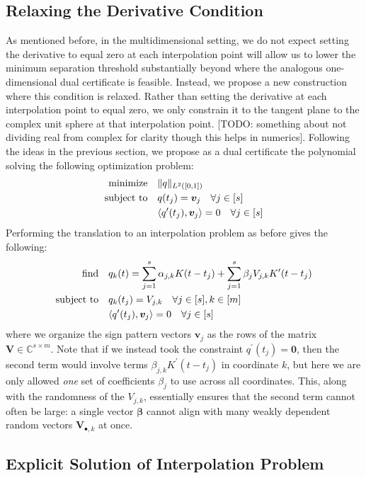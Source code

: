 \documentclass[11pt]{article}
\newcommand{\ra}{\rangle}
\newcommand{\la}{\langle}
\newcommand{\CC}{\mathbb{C}}
\newcommand{\HS}{\hspace{3.5mm}}
\newcommand{\bV}{\bm V}
\newcommand{\bv}{\bm v}
\begin{document}
\subsection{Relaxing the Derivative Condition}

As mentioned before, in the multidimensional setting, we do not expect setting the derivative to equal zero at each interpolation point will allow us to lower the minimum separation threshold substantially beyond where the analogous one-dimensional dual certificate is feasible.
Instead, we propose a new construction where this condition is relaxed.
Rather than setting the derivative at each interpolation point to equal zero, we only constrain it to the tangent plane to the complex unit sphere at that interpolation point.
[TODO: something about not dividing real from complex for clarity though this helps in numerics].
Following the ideas in the previous section, we propose as a dual certificate the polynomial solving the following optimization problem:
\begin{align}
  \text{minimize} &\HS \|q\|_{L^2([0, 1])} \\
  \text{subject to} &\HS q(t_j) = \bv_j \HS \forall j \in [s] \\
                  &\HS \la q^\prime(t_j), \bv_j \ra = 0 \HS \forall j \in [s]
\end{align}
Performing the translation to an interpolation problem as before gives the following:
\begin{align}
  \text{find} &\HS q_k(t) = \sum_{j = 1}^s \alpha_{j, k} K(t - t_j) + \sum_{j = 1}^s \beta_jV_{j, k} K^\prime(t - t_j) \\
  \text{subject to} &\HS q_k(t_j) = V_{j, k} \HS \forall j \in [s], k \in [m] \\
                  &\HS \la q^\prime(t_j), \bv_j \ra = 0 \HS \forall j \in [s]
\end{align}
where we organize the sign pattern vectors $\bv_j$ as the rows of the matrix $\bV \in \CC^{s \times m}$.
Note that if we instead took the constraint $q^\prime(t_j) = \bm 0$, then the second term would involve terms $\beta_{j, k}K^\prime(t - t_j)$ in coordinate $k$, but here we are only allowed \emph{one} set of coefficients $\beta_j$ to use across all coordinates.
This, along with the randomness of the $V_{j, k}$, essentially ensures that the second term cannot often be large: a single vector $\bm \beta$ cannot align with many weakly dependent random vectors $\bV_{\bullet, k}$ at once.

\subsection{Explicit Solution of Interpolation Problem}
\end{document}
